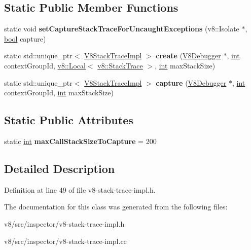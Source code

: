 \subsection*{Static Public Member Functions}
\begin{DoxyCompactItemize}
\item 
\mbox{\label{classv8__inspector_1_1V8StackTraceImpl_ae35ba83a16fb2fba35ecb5dfee161103}} 
static void {\bfseries set\+Capture\+Stack\+Trace\+For\+Uncaught\+Exceptions} (v8\+::\+Isolate $\ast$, \mbox{\hyperlink{classbool}{bool}} capture)
\item 
\mbox{\label{classv8__inspector_1_1V8StackTraceImpl_aad2c0d113556a3a83238bcffd94e065c}} 
static std\+::unique\+\_\+ptr$<$ \mbox{\hyperlink{classv8__inspector_1_1V8StackTraceImpl}{V8\+Stack\+Trace\+Impl}} $>$ {\bfseries create} (\mbox{\hyperlink{classv8__inspector_1_1V8Debugger}{V8\+Debugger}} $\ast$, \mbox{\hyperlink{classint}{int}} context\+Group\+Id, \mbox{\hyperlink{classv8_1_1Local}{v8\+::\+Local}}$<$ \mbox{\hyperlink{classv8_1_1StackTrace}{v8\+::\+Stack\+Trace}} $>$, \mbox{\hyperlink{classint}{int}} max\+Stack\+Size)
\item 
\mbox{\label{classv8__inspector_1_1V8StackTraceImpl_a60d81952bd4a04117c022870da3420e1}} 
static std\+::unique\+\_\+ptr$<$ \mbox{\hyperlink{classv8__inspector_1_1V8StackTraceImpl}{V8\+Stack\+Trace\+Impl}} $>$ {\bfseries capture} (\mbox{\hyperlink{classv8__inspector_1_1V8Debugger}{V8\+Debugger}} $\ast$, \mbox{\hyperlink{classint}{int}} context\+Group\+Id, \mbox{\hyperlink{classint}{int}} max\+Stack\+Size)
\end{DoxyCompactItemize}
\subsection*{Static Public Attributes}
\begin{DoxyCompactItemize}
\item 
\mbox{\label{classv8__inspector_1_1V8StackTraceImpl_af650046bf3855ed4d828d516b067aa09}} 
static \mbox{\hyperlink{classint}{int}} {\bfseries max\+Call\+Stack\+Size\+To\+Capture} = 200
\end{DoxyCompactItemize}


\subsection{Detailed Description}


Definition at line 49 of file v8-\/stack-\/trace-\/impl.\+h.



The documentation for this class was generated from the following files\+:\begin{DoxyCompactItemize}
\item 
v8/src/inspector/v8-\/stack-\/trace-\/impl.\+h\item 
v8/src/inspector/v8-\/stack-\/trace-\/impl.\+cc\end{DoxyCompactItemize}
